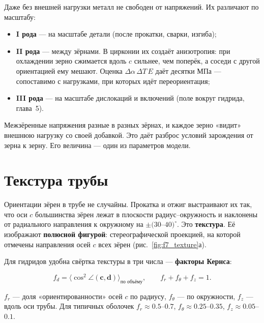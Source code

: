 Даже без внешней нагрузки металл не свободен от напряжений. Их различают по масштабу:
\begin{itemize}
\item \textbf{I рода} --- на масштабе детали (после прокатки, сварки, изгиба);
\item \textbf{II рода} --- между зёрнами. В цирконии их создаёт анизотропия: при охлаждении зерно сжимается вдоль
  $c$ сильнее, чем поперёк, а соседи с другой ориентацией ему мешают. Оценка $\Delta\alpha\,\Delta T\,E$ даёт
  десятки МПа --- сопоставимо с нагрузками, при которых идёт переориентация;
\item \textbf{III рода} --- на масштабе дислокаций и включений (поле вокруг гидрида, глава~5).
\end{itemize}

\begin{zrbox}
Межзёренные напряжения разные в разных зёрнах, и каждое зерно «видит» внешнюю нагрузку со своей добавкой. Это
даёт разброс условий зарождения от зерна к зерну. Его величина --- один из параметров модели.
\end{zrbox}

\section{Текстура трубы}
\label{sec:texture}

Ориентации зёрен в трубе не случайны. Прокатка и отжиг выстраивают их так, что оси $c$ большинства зёрен лежат
в плоскости радиус--окружность и наклонены от радиального направления к окружному на $\pm(30$--$40)^\circ$. Это
\textbf{текстура}. Её изображают \textbf{полюсной фигурой}: стереографической проекцией, на которой отмечены
направления осей $c$ всех зёрен (рис.~\ref{fig:f7_texture}а).

Для гидридов удобна свёртка текстуры в три числа --- \textbf{факторы Кернса}:
\begin{keyf}
\[
f_d = \bigl\langle\cos^2\angle(\mathbf c,\mathbf d)\bigr\rangle_{\text{по объёму}},\qquad f_r+f_\theta+f_z = 1 .
\]
\end{keyf}
$f_r$ --- доля «ориентированности» осей $c$ по радиусу, $f_\theta$ --- по окружности, $f_z$ --- вдоль оси трубы. Для
типичных оболочек $f_r\approx0.5$--$0.7$, $f_\theta\approx0.25$--$0.35$, $f_z\approx0.05$--$0.1$.


